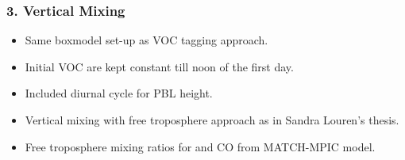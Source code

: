 {
    \begin{frame}[plain]
    \end{frame}
}

\begin{frame}
    \frametitle{3. Vertical Mixing}

    \begin{itemize}
        \item Same boxmodel set-up as VOC tagging approach.
        \item Initial VOC are kept constant till noon of the first day.
        \item Included diurnal cycle for PBL height.
        \item Vertical mixing with free troposphere approach as in Sandra Louren's thesis.
        \item Free troposphere mixing ratios for  and CO from MATCH-MPIC model.
    \end{itemize}
\end{frame}

